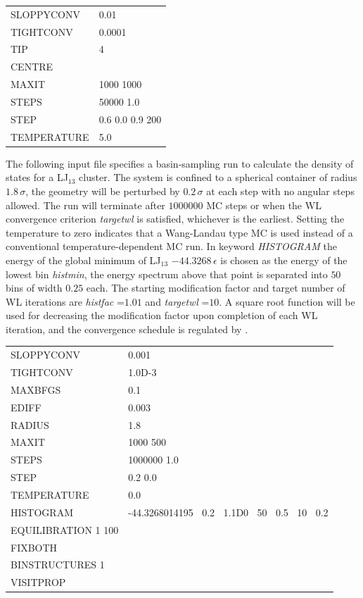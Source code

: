 \medskip
\begin{tabular}{ll}
SLOPPYCONV & 0.01 \\
TIGHTCONV & 0.0001 \\
TIP & 4 \\
CENTRE & \\
MAXIT & 1000 1000\\
STEPS & 50000 1.0\\
STEP & 0.6 0.0 0.9 200 \\
TEMPERATURE & 5.0\\
\end{tabular}
\medskip

\noindent The following input file specifies a basin-sampling run to calculate the density of states for 
a LJ$_{13}$ cluster. The system is
confined to a spherical container of radius $1.8\,\sigma$, 
the geometry will be perturbed by $0.2\,\sigma$ at each step with no
angular steps allowed. The run will terminate after $1000000$ 
MC steps or when the WL convergence criterion {\it targetwl}
is satisfied, whichever is the earliest. Setting the temperature to zero indicates that 
a Wang-Landau type MC is used instead of
a conventional temperature-dependent MC run. In keyword {\it HISTOGRAM\/}
the energy of the global minimum of LJ$_{13}$ $-44.3268\,\epsilon$ is chosen
as the energy of the lowest bin {\it histmin}, the energy spectrum above that point is 
separated into $50$ bins of width $0.25$ each. The
starting modification factor and target number of WL iterations are 
{\it histfac} =$ 1.01$ and {\it targetwl} =$ 10$. A square root function
will  be used for decreasing the modification factor upon completion of each WL iteration, 
and the convergence schedule is regulated by {}.  


\medskip
\begin{tabular}{ll}
SLOPPYCONV & 0.001 \\
TIGHTCONV & 1.0D-3 \\
MAXBFGS &  0.1 \\
EDIFF & 0.003 \\
RADIUS &  1.8 \\
MAXIT & 1000 500 \\
STEPS & 1000000 1.0 \\
STEP  & 0.2 0.0 \\
TEMPERATURE & 0.0 \\
HISTOGRAM & -44.3268014195 $\:$ 0.2 $\:$ 1.1D0 $\:$ 50 $\:$ 0.5 $\:$ 10 $\:$ 0.2 \\
EQUILIBRATION 1 100 \\
FIXBOTH \\
BINSTRUCTURES 1 \\
VISITPROP \\
\end{tabular}
\medskip

